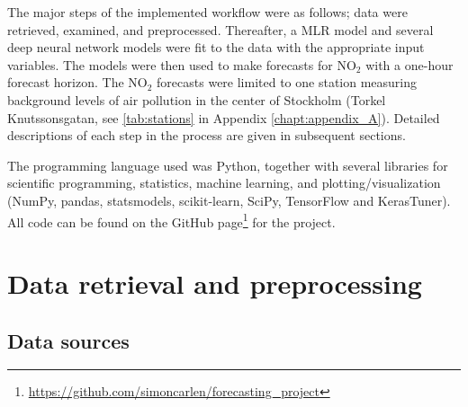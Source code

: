 The major steps of the implemented workflow were as follows; data were retrieved, examined, and preprocessed. Thereafter, a MLR model and several deep neural network models were fit to the data with the appropriate input variables. The models were then used to make forecasts for NO$_2$ with a one-hour forecast horizon. The NO$_2$ forecasts were limited to one station measuring background levels of air pollution in the center of Stockholm (Torkel Knutssonsgatan, see \cref{tab:stations} in Appendix \ref{chapt:appendix_A}). Detailed descriptions of each step in the process are given in subsequent sections. 

The programming language used was Python, together with several libraries for scientific programming, statistics, machine learning, and plotting/visualization (NumPy, pandas, statsmodels, scikit-learn, SciPy, TensorFlow and KerasTuner). All code can be found on the GitHub page\footnote{\url{https://github.com/simoncarlen/forecasting_project}} for the project.



\section{Data retrieval and preprocessing}
\label{chap:dataprocesschap}

\subsection{Data sources}
\label{sec:data-sources}

